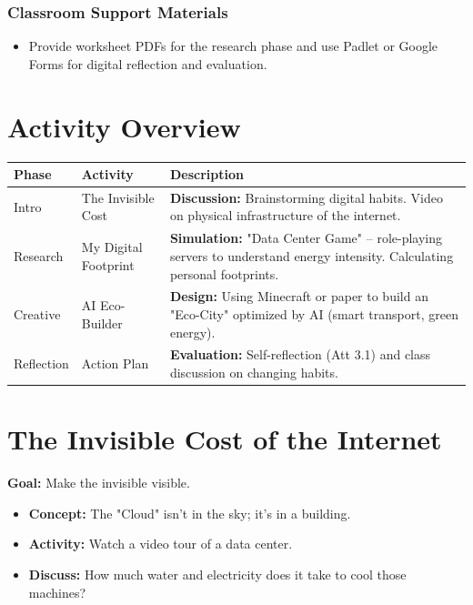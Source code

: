 \documentclass[11pt, a4paper]{article}
\begin{document}
\subsubsection*{Classroom Support Materials}
\begin{itemize}
    \item Provide worksheet PDFs for the research phase and use Padlet or Google Forms for digital reflection and evaluation.
\end{itemize}

\section*{Activity Overview}
\begingroup
\small
\begin{tabularx}{\textwidth}{|l|l|L|}
    \hline
     \textbf{Phase} & \textbf{Activity} & \textbf{Description} \\ \hline
    Intro & The Invisible Cost & \textbf{Discussion:} Brainstorming digital habits. Video on physical infrastructure of the internet. \\ \hline
    Research & My Digital Footprint & \textbf{Simulation:} "Data Center Game" -- role-playing servers to understand energy intensity. Calculating personal footprints. \\ \hline
    Creative & AI Eco-Builder & \textbf{Design:} Using Minecraft or paper to build an "Eco-City" optimized by AI (smart transport, green energy). \\ \hline
    Reflection & Action Plan & \textbf{Evaluation:} Self-reflection (Att 3.1) and class discussion on changing habits. \\ \hline
\end{tabularx}
\endgroup

\section{The Invisible Cost of the Internet}
\textbf{Goal:} Make the invisible visible.
\begin{itemize}
    \item \textbf{Concept:} The "Cloud" isn't in the sky; it's in a building.
    \item \textbf{Activity:} Watch a video tour of a data center.
    \item \textbf{Discuss:} How much water and electricity does it take to cool those machines?
\end{itemize}
\end{document}
